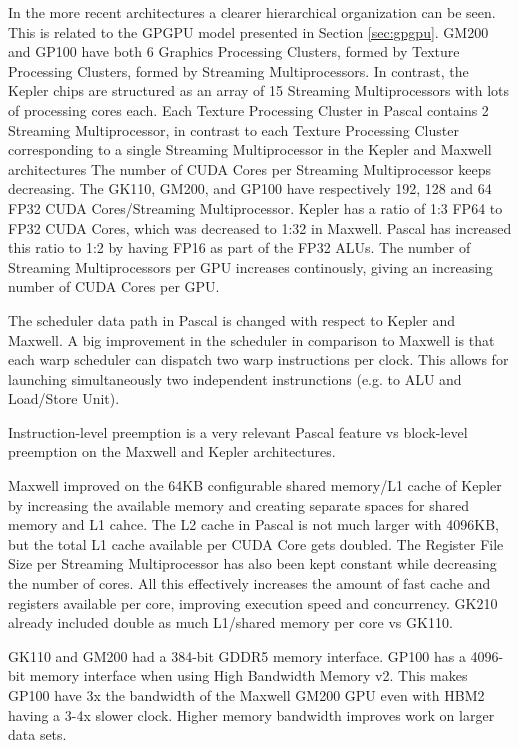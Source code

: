In the more recent architectures a clearer hierarchical organization can be seen.
This is related to the GPGPU model presented in Section \ref{sec:gpgpu}.
GM200 and GP100 have both 6 Graphics Processing Clusters, formed by Texture Processing Clusters, formed by Streaming Multiprocessors.
In contrast, the Kepler chips are structured as an array of 15 Streaming Multiprocessors with lots of processing cores each.
Each Texture Processing Cluster in Pascal contains 2 Streaming Multiprocessor, in contrast to each Texture Processing Cluster corresponding to a single Streaming Multiprocessor in the Kepler and Maxwell architectures
The number of CUDA Cores per Streaming Multiprocessor keeps decreasing.
The GK110, GM200, and GP100 have respectively 192, 128 and 64 FP32 CUDA Cores/Streaming Multiprocessor.
Kepler has a ratio of 1:3 FP64 to FP32 CUDA Cores, which was decreased to 1:32 in Maxwell.
Pascal has increased this ratio to 1:2 by having FP16 as part of the FP32 ALUs.
The number of Streaming Multiprocessors per GPU increases continously, giving an increasing number of CUDA Cores per GPU.

The scheduler data path in Pascal is changed with respect to Kepler and Maxwell.
A big improvement in the scheduler in comparison to Maxwell is that each warp scheduler can dispatch two warp instructions per clock.
This allows for launching simultaneously two independent instrunctions (e.g. to ALU and Load/Store Unit).

Instruction-level preemption is a very relevant Pascal feature vs block-level preemption on the Maxwell and Kepler architectures.

Maxwell improved on the 64KB configurable shared memory/L1 cache of Kepler by increasing the available memory and creating separate spaces for shared memory and L1 cahce.
The L2 cache in Pascal is not much larger with 4096KB, but the total L1 cache available per CUDA Core gets doubled.
The Register File Size per Streaming Multiprocessor has also been kept constant while decreasing the number of cores.
All this effectively increases the amount of fast cache and registers available per core, improving execution speed and concurrency.
GK210 already included double as much L1/shared memory per core vs GK110.

GK110 and GM200 had a 384-bit GDDR5 memory interface.
GP100 has a 4096-bit memory interface when using High Bandwidth Memory v2.
This makes GP100 have 3x the bandwidth of the Maxwell GM200 GPU even with HBM2 having a 3-4x slower clock.
Higher memory bandwidth improves work on larger data sets.

